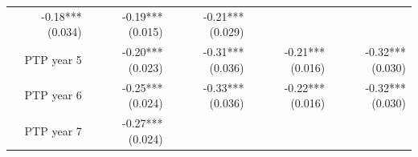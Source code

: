 \documentclass[]{article}
\begin{document}
\begin{longtable}[c]{@{}rrrrr@{}}
\begin{minipage}[t]{0.16\columnwidth}
-0.18*** (0.034)
\strut\end{minipage} &
\begin{minipage}[t]{0.18\columnwidth}\raggedleft\strut
-0.19*** (0.015)
\strut\end{minipage} &
\begin{minipage}[t]{0.15\columnwidth}\raggedleft\strut
-0.21*** (0.029)
\strut\end{minipage}\tabularnewline
\begin{minipage}[t]{0.17\columnwidth}\raggedleft\strut
PTP year 5
\strut\end{minipage} &
\begin{minipage}[t]{0.20\columnwidth}\raggedleft\strut
-0.20*** (0.023)
\strut\end{minipage} &
\begin{minipage}[t]{0.16\columnwidth}\raggedleft\strut
-0.31*** (0.036)
\strut\end{minipage} &
\begin{minipage}[t]{0.18\columnwidth}\raggedleft\strut
-0.21*** (0.016)
\strut\end{minipage} &
\begin{minipage}[t]{0.15\columnwidth}\raggedleft\strut
-0.32*** (0.030)
\strut\end{minipage}\tabularnewline
\begin{minipage}[t]{0.17\columnwidth}\raggedleft\strut
PTP year 6
\strut\end{minipage} &
\begin{minipage}[t]{0.20\columnwidth}\raggedleft\strut
-0.25*** (0.024)
\strut\end{minipage} &
\begin{minipage}[t]{0.16\columnwidth}\raggedleft\strut
-0.33*** (0.036)
\strut\end{minipage} &
\begin{minipage}[t]{0.18\columnwidth}\raggedleft\strut
-0.22*** (0.016)
\strut\end{minipage} &
\begin{minipage}[t]{0.15\columnwidth}\raggedleft\strut
-0.32*** (0.030)
\strut\end{minipage}\tabularnewline
\begin{minipage}[t]{0.17\columnwidth}\raggedleft\strut
PTP year 7
\strut\end{minipage} &
\begin{minipage}[t]{0.20\columnwidth}\raggedleft\strut
-0.27*** (0.024)
\strut\end{minipage} &
\begin{minipage}[t]{0.16\columnwidth}\raggedleft\strut

\end{minipage}
\end{longtable}
\end{document}

